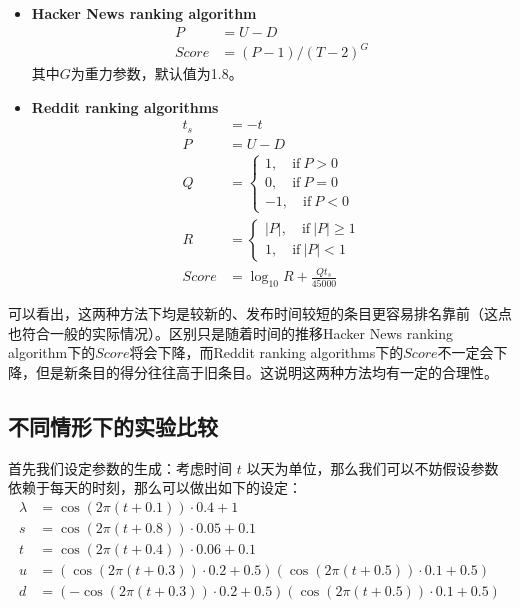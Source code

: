 \documentclass[UTF8]{ctexart}
\theoremstyle{plain}
\theoremstyle{definition}
\theoremstyle{remark}
\begin{document}
    \begin{itemize}
        \item \textbf{Hacker News ranking algorithm}
        \begin{equation}
        \begin{aligned}
        P & = U - D \\
	    Score & = (P - 1)/(T - 2)^G
        \end{aligned}
	    \end{equation}
        其中$G$为重力参数，默认值为1.8。
        \item \textbf{Reddit ranking algorithms}
        \begin{equation}
        \begin{aligned}
        t_{s} & = -t \\
        P & = U - D \\
        Q & = \begin{cases}
                1, \quad \mathrm{if} \ P > 0 \\
                0, \quad \mathrm{if} \ P = 0 \\
                -1, \quad \mathrm{if} \ P < 0
            \end{cases} \\
        R & = \begin{cases}
            |P|, \quad \mathrm{if} \ |P| \geq 1 \\
            1, \quad \mathrm{if} \ |P| < 1
            \end{cases} \\
        Score & =  \log_{10} R + \frac{Qt_s}{45000}
        \end{aligned}
	    \end{equation}
    \end{itemize}
    可以看出，这两种方法下均是较新的、发布时间较短的条目更容易排名靠前（这点也符合一般的实际情况）。区别只是随着时间的推移Hacker News ranking algorithm下的$Score$将会下降，而Reddit ranking algorithms下的$Score$不一定会下降，但是新条目的得分往往高于旧条目。这说明这两种方法均有一定的合理性。

	\subsection{不同情形下的实验比较}
	首先我们设定参数的生成：考虑时间 $t$ 以天为单位，那么我们可以不妨假设参数依赖于每天的时刻，那么可以做出如下的设定：
	\begin{align}
		\lambda &= \cos(2\pi(t+0.1)) \cdot 0.4 + 1 \\
		s &= \cos(2\pi(t+0.8)) \cdot 0.05 + 0.1 \\
		t &= \cos(2\pi(t+0.4))\cdot 0.06 + 0.1 \\
		u &= (\cos(2\pi(t+0.3)) \cdot 0.2 + 0.5)(\cos(2\pi(t+0.5))\cdot 0.1 + 0.5) \\
		d &= (-\cos(2\pi(t+0.3)) \cdot 0.2 + 0.5)(\cos(2\pi(t+0.5))\cdot 0.1 + 0.5)
	\end{align}
	
\end{document}

